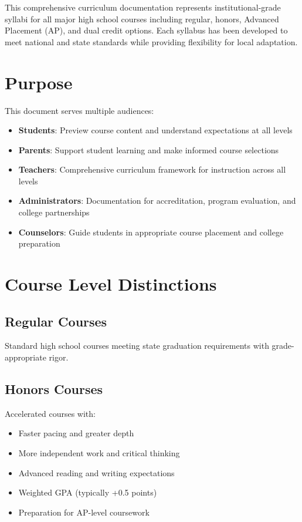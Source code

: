 \documentclass[12pt,oneside]{book}
\begin{document}
This comprehensive curriculum documentation represents institutional-grade syllabi for all major
high school courses including regular, honors, Advanced Placement (AP), and dual credit options.
Each syllabus has been developed to meet national and state standards while providing flexibility
for local adaptation.

\section*{Purpose}
This document serves multiple audiences:
\begin{itemize}[leftmargin=2em]
    \item \textbf{Students}: Preview course content and understand expectations at all levels
    \item \textbf{Parents}: Support student learning and make informed course selections
    \item \textbf{Teachers}: Comprehensive curriculum framework for instruction across all levels
    \item \textbf{Administrators}: Documentation for accreditation, program evaluation, and college partnerships
    \item \textbf{Counselors}: Guide students in appropriate course placement and college preparation
\end{itemize}

\section*{Course Level Distinctions}
\subsection*{Regular Courses}
Standard high school courses meeting state graduation requirements with grade-appropriate rigor.

\subsection*{Honors Courses}
Accelerated courses with:
\begin{itemize}[leftmargin=2em]
    \item Faster pacing and greater depth
    \item More independent work and critical thinking
    \item Advanced reading and writing expectations
    \item Weighted GPA (typically +0.5 points)
    \item Preparation for AP-level coursework
\end{itemize}
\end{document}
